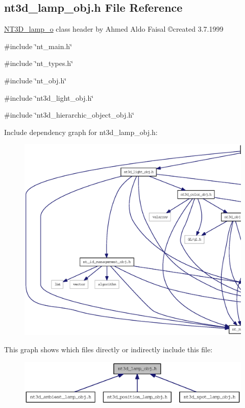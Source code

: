 \subsection{nt3d\_\-lamp\_\-obj.h File Reference}
\label{nt3d__lamp__obj_8h}



\begin{DoxyItemize}
\item \hyperlink{class_n_t3_d__lamp__o}{NT3D\_\-lamp\_\-o} class header by Ahmed Aldo Faisal \copyright created 3.7.1999 
\end{DoxyItemize} 


{\ttfamily \#include \char`\"{}nt\_\-main.h\char`\"{}}\par
{\ttfamily \#include \char`\"{}nt\_\-types.h\char`\"{}}\par
{\ttfamily \#include \char`\"{}nt\_\-obj.h\char`\"{}}\par
{\ttfamily \#include \char`\"{}nt3d\_\-light\_\-obj.h\char`\"{}}\par
{\ttfamily \#include \char`\"{}nt3d\_\-hierarchic\_\-object\_\-obj.h\char`\"{}}\par
Include dependency graph for nt3d\_\-lamp\_\-obj.h:
\nopagebreak
\begin{figure}[H]
\begin{center}
\leavevmode
\includegraphics[width=400pt]{nt3d__lamp__obj_8h__incl}
\end{center}
\end{figure}
This graph shows which files directly or indirectly include this file:
\nopagebreak
\begin{figure}[H]
\begin{center}
\leavevmode
\includegraphics[width=400pt]{nt3d__lamp__obj_8h__dep__incl}
\end{center}
\end{figure}
